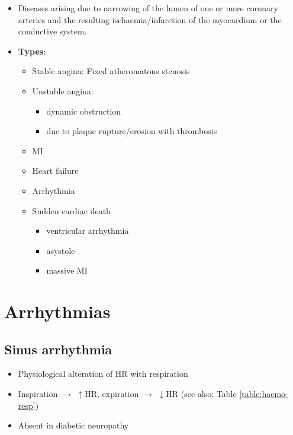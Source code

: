 \documentclass[
  12pt,
]{memoir}
\providecommand{\tightlist}{%
  \setlength{\itemsep}{0pt}\setlength{\parskip}{0pt}}
\begin{document}
\begin{itemize}
\tightlist
\item
  Diseases arising due to narrowing of the lumen of one or more coronary
  arteries and the resulting ischaemia/infarction of the myocardium or
  the conductive system.
\item
  \textbf{Types}:

  \begin{itemize}
  \tightlist
  \item
    Stable angina: Fixed atheromatous stenosis
  \item
    Unstable angina:

    \begin{itemize}
    \tightlist
    \item
      dynamic obstruction
    \item
      due to plaque rupture/erosion with thrombosis
    \end{itemize}
  \item
    MI
  \item
    Heart failure
  \item
    Arrhythmia
  \item
    Sudden cardiac death

    \begin{itemize}
    \tightlist
    \item
      ventricular arrhythmia
    \item
      asystole
    \item
      massive MI
    \end{itemize}
  \end{itemize}
\end{itemize}

\hypertarget{arrhythmias}{%
\section{Arrhythmias}\label{arrhythmias}}

\hypertarget{sinus-arrhythmia}{%
\subsection{Sinus arrhythmia}\label{sinus-arrhythmia}}

\begin{itemize}
\tightlist
\item
  Physiological alteration of HR with respiration
\item
  Inspiration \(\rightarrow\) \(\uparrow\)HR, expiration \(\rightarrow\)
  \(\downarrow\)HR (see also: Table \ref{table:haemo-resp})
\item
  Absent in diabetic neuropathy
\end{itemize}
\end{document}
